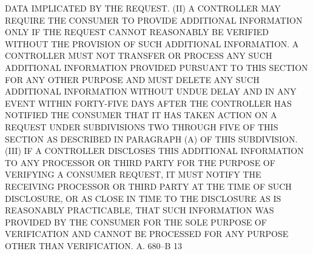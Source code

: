 DATA IMPLICATED BY THE REQUEST.
   (II)  A  CONTROLLER  MAY  REQUIRE  THE  CONSUMER TO PROVIDE ADDITIONAL
 INFORMATION ONLY IF THE REQUEST CANNOT REASONABLY  BE  VERIFIED  WITHOUT
 THE  PROVISION  OF  SUCH  ADDITIONAL  INFORMATION. A CONTROLLER MUST NOT
 TRANSFER OR PROCESS ANY SUCH ADDITIONAL INFORMATION PROVIDED PURSUANT TO
 THIS SECTION FOR ANY OTHER PURPOSE AND MUST DELETE ANY  SUCH  ADDITIONAL
 INFORMATION  WITHOUT UNDUE DELAY AND IN ANY EVENT WITHIN FORTY-FIVE DAYS
 AFTER THE CONTROLLER HAS NOTIFIED THE CONSUMER THAT IT HAS TAKEN  ACTION
 ON  A  REQUEST  UNDER  SUBDIVISIONS  TWO THROUGH FIVE OF THIS SECTION AS
 DESCRIBED IN PARAGRAPH (A) OF THIS SUBDIVISION.
   (III) IF A CONTROLLER DISCLOSES THIS  ADDITIONAL  INFORMATION  TO  ANY
 PROCESSOR  OR  THIRD  PARTY  FOR  THE  PURPOSE  OF  VERIFYING A CONSUMER
 REQUEST, IT MUST NOTIFY THE RECEIVING PROCESSOR OR THIRD  PARTY  AT  THE
 TIME  OF  SUCH  DISCLOSURE,  OR AS CLOSE IN TIME TO THE DISCLOSURE AS IS
 REASONABLY PRACTICABLE,  THAT  SUCH  INFORMATION  WAS  PROVIDED  BY  THE
 CONSUMER  FOR  THE  SOLE PURPOSE OF VERIFICATION AND CANNOT BE PROCESSED
 FOR ANY PURPOSE OTHER THAN VERIFICATION.
 A. 680--B                          13

